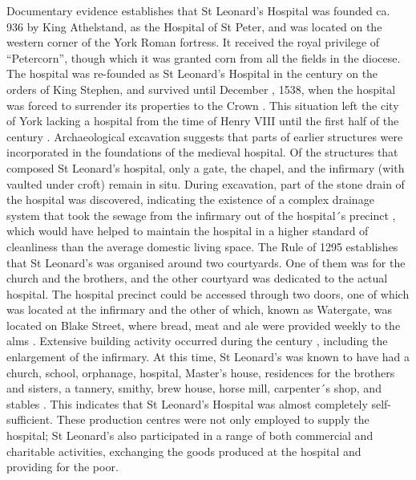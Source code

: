 \documentclass[%
	]{ijsra}
\begin{document}
Documentary evidence establishes that St Leonard’s Hospital was founded ca.\, 936 by King Athelstand, as the Hospital of St Peter, and was located on the western corner of the York Roman fortress. It received the royal privilege of “Petercorn”, though which it was granted corn from all the fields in the diocese. The hospital was re-founded as St Leonard’s Hospital in the  century \AD on the orders of King Stephen, and survived until December , 1538, when the hospital was forced to surrender its properties to the Crown 
\parencite[288]{Palliser_2014}. This situation left the city of York lacking a hospital from the time of Henry VIII until the first half of the  century \AD \parencite{YorkMuseumGardens_2016}.
Archaeological excavation suggests that parts of earlier structures were incorporated in the foundations of the medieval hospital. Of the structures that composed St Leonard’s hospital, only a gate, the chapel, and the infirmary (with vaulted under croft) remain in situ. During excavation, part of the stone drain of the hospital was discovered, indicating the existence of a complex drainage system that took the sewage from the infirmary out of the hospital´s precinct \parencite{Johnson_2014}, which would have helped to maintain the hospital in a higher standard of cleanliness than the average domestic living space.
The Rule of 1295 establishes that St Leonard’s was organised around two courtyards. One of them was for the church and the brothers, and the other courtyard was dedicated to the actual hospital. The hospital precinct could be accessed through two doors, one of which was located at the infirmary and the other of which, known as Watergate, was located on Blake Street, where bread, meat and ale were provided weekly to the alms \parencites[8-9,28-29]{Cullum_1991}[17]{Cullum_1999}{Johnson_2014}[151]{Palliser_2014}[116]{Raine_1955}[314]{Rawcliffe_2004}.
Extensive building activity occurred during the  century \AD, including the enlargement of the infirmary. At this time, St Leonard’s was known to have had a church, school, orphanage, hospital, Master’s house, residences for the brothers and sisters, a tannery, smithy, brew house, horse mill, carpenter´s shop, and stables 
\parencites[99]{Dean_2008}[116]{Raine_1955}. This indicates that St Leonard’s Hospital was almost completely self-sufficient. These production centres were not only employed to supply the hospital; St Leonard’s also participated in a range of both commercial and charitable activities, exchanging the goods produced at the hospital and providing for the poor.
\end{document}

